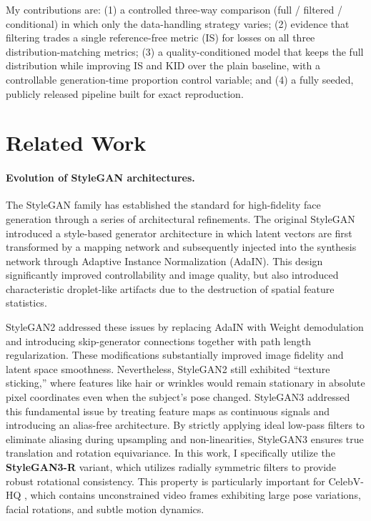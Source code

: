 \documentclass{article}
\begin{document}
My contributions are: (1) a controlled three-way comparison (full / filtered /
conditional) in which only the data-handling strategy varies; (2) evidence that
filtering trades a single reference-free metric (IS) for losses on all three
distribution-matching metrics; (3) a quality-conditioned model that keeps the
full distribution while improving IS and KID over the plain baseline, with a
controllable generation-time proportion control variable; and (4) a fully seeded, publicly
released pipeline built for exact reproduction.

\section{Related Work}

\paragraph{Evolution of StyleGAN architectures.}
The StyleGAN family has established the standard for high-fidelity face generation through a series of architectural refinements. The original StyleGAN \citep{karras2019stylegan} introduced a style-based generator architecture in which latent vectors are first transformed by a mapping network and subsequently injected into the synthesis network through Adaptive Instance Normalization (AdaIN). This design significantly improved controllability and image quality, but also introduced characteristic droplet-like artifacts due to the destruction of spatial feature statistics.

StyleGAN2 \citep{karras2020stylegan2} addressed these issues by replacing AdaIN with Weight demodulation and introducing skip-generator connections together with path length regularization. These modifications substantially improved image fidelity and latent space smoothness. Nevertheless, StyleGAN2 still exhibited ``texture sticking,'' where features like hair or wrinkles would remain stationary in absolute pixel coordinates even when the subject's pose changed. StyleGAN3 \citep{karras2021alias} addressed this fundamental issue by treating feature maps as continuous signals and introducing an alias-free architecture. By strictly applying ideal low-pass filters to eliminate aliasing during upsampling and non-linearities, StyleGAN3 ensures true translation and rotation equivariance. In this work, I specifically utilize the \textbf{StyleGAN3-R} variant, which utilizes radially symmetric filters to provide robust rotational consistency. This property is particularly important for CelebV-HQ \citep{zhu2022celebvhq}, which contains unconstrained video frames exhibiting large pose variations, facial rotations, and subtle motion dynamics.
\end{document}
